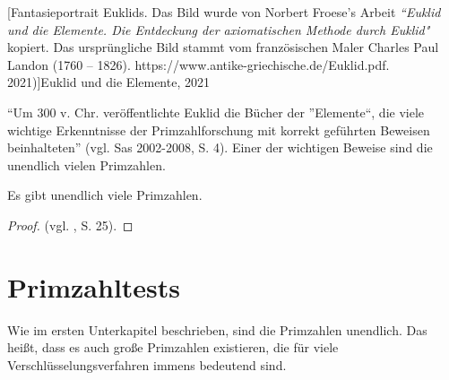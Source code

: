 \begin{minipage}[r]{0.3\linewidth}
  [Fantasieportrait Euklids. Das Bild wurde von Norbert Froese's Arbeit \textit{``Euklid und die Elemente. Die Entdeckung der axiomatischen Methode durch Euklid"} kopiert. Das ursprüngliche Bild stammt vom französischen Maler Charles Paul Landon (1760 – 1826). https://www.antike-griechische.de/Euklid.pdf. 2021)]{Euklid und die Elemente, 2021}
  \label{fig:sample_figure}
\end{minipage}
\vspace{.3cm}

``Um 300 v. Chr. veröffentlichte Euklid die Bücher der
”Elemente“, die viele wichtige Erkenntnisse der Primzahlforschung
mit korrekt geführten Beweisen beinhalteten'' (vgl. Sas
2002-2008, S. 4). Einer der wichtigen Beweise sind die
unendlich vielen Primzahlen.

\begin{mythm}
Es gibt unendlich viele Primzahlen.
\end{mythm}
\begin{proof}

(vgl. \cite{schichlsteinbauer}, S. 25).
\end{proof}

\newpage

\section{Primzahltests}

Wie im ersten Unterkapitel beschrieben, sind die Primzahlen
unendlich. Das heißt, dass es auch große Primzahlen
existieren, die für viele Verschlüsselungsverfahren immens
bedeutend sind.
